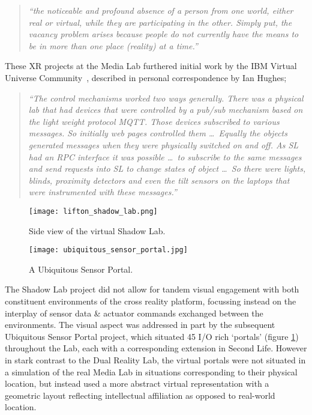 \begin{quote}
\textit{``the noticeable and profound absence of a person from one world, either real or virtual, while they are participating in the other. Simply put, the vacancy problem arises because people do not currently have the means to be in more than one place (reality) at a time.''}
\end{quote}

These XR projects at the Media Lab furthered initial work by the IBM Virtual Universe Community~\cite{Hughes2006, Hughes2006a,Hughes2006b}, described in personal correspondence by Ian Hughes;

\begin{quote}
\textit{``The control mechanisms worked two ways generally. There was a physical lab that had devices that were controlled by a pub/sub mechanism based on the light weight protocol MQTT. Those devices subscribed to various messages. So initially web pages controlled them \ldots\ Equally the objects generated messages when they were physically switched on and off. As SL had an RPC interface it was possible \ldots\ to subscribe to the same messages and send requests into SL to change states of object \ldots\ So there were lights, blinds, proximity detectors and even the tilt sensors on the laptops that were instrumented with these messages.''}
\end{quote}

\begin{figure}[h]
\centering
\begin{minipage}{.5\textwidth}
  \centering
  \texttt{[image: lifton\_shadow\_lab.png]}
  \caption{Side view of the virtual Shadow Lab.}
  \label{lifton_shadow_lab.png}
\end{minipage}%
\begin{minipage}{.5\textwidth}
  \centering
  \texttt{[image: ubiquitous\_sensor\_portal.jpg]}
    \caption{A Ubiquitous Sensor Portal.}
    \label{ubiquitous_sensor_portal.jpg}
\end{minipage}
\end{figure}

The Shadow Lab project did not allow for tandem visual engagement with both constituent environments of the cross reality platform, focussing instead on the interplay of sensor data \& actuator commands exchanged between the environments. The visual aspect was addressed in part by the subsequent Ubiquitous Sensor Portal project, which situated 45 I/O rich `portals' (figure \ref{ubiquitous_sensor_portal.jpg}) throughout the Lab, each with a corresponding extension in Second Life. However in stark contrast to the Dual Reality Lab, the virtual portals were not situated in a simulation of the real Media Lab in situations corresponding to their physical location, but instead used a more abstract virtual representation with a geometric layout reflecting intellectual affiliation as opposed to real-world location.

